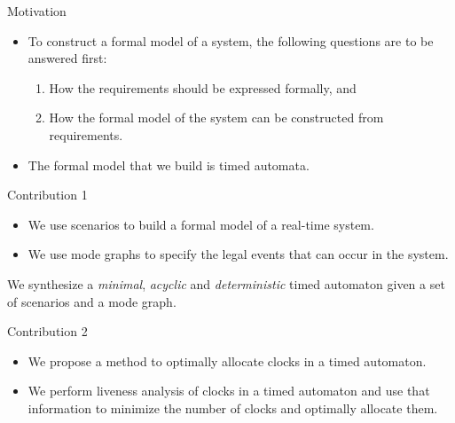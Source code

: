 \documentclass[10pt]{beamer}
\theoremstyle{plain}
\theoremstyle{definition}
\begin{document}
\begin{frame}{Motivation}
	\begin{itemize}
		\item	{To construct a formal model of a system, the following questions are to be answered first:
					\begin{enumerate}
						\item How the requirements should be expressed formally, and
						\item How the formal model of the system can be constructed from requirements.
					\end{enumerate}
				}
		\item {The formal model that we build is \alert{timed automata}.}
\end{itemize}
\end{frame}

\begin{frame}{Contribution 1}
	\begin{itemize}
		\item We use scenarios to build a formal model of a real-time system. %
		\item We use mode graphs to specify the legal events that can occur in the system.
	\end{itemize}
	\alert{We synthesize a \emph{minimal}, \emph{acyclic} and \emph{deterministic} timed automaton given a set of scenarios and a mode graph.}
\end{frame}


\begin{frame}{Contribution 2}
	\begin{itemize}
		\item We propose a method to optimally allocate clocks in a timed automaton.
		\item We perform liveness analysis of clocks in a timed automaton and use that information to minimize the number of clocks and optimally allocate them.
	\end{itemize}
\end{frame}
\end{document}
